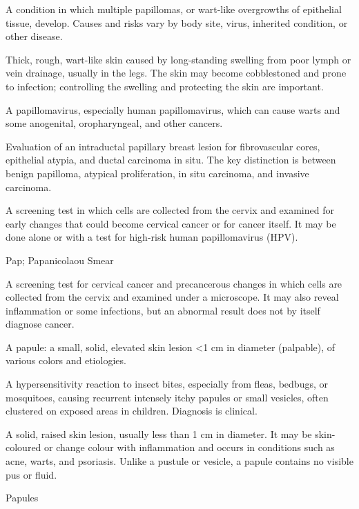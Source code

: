  A condition in which multiple papillomas, or wart-like overgrowths of epithelial tissue, develop. Causes and risks vary by body site, virus, inherited condition, or other disease.

 Thick, rough, wart-like skin caused by long-standing swelling from poor lymph or vein drainage, usually in the legs. The skin may become cobblestoned and prone to infection; controlling the swelling and protecting the skin are important.

 A papillomavirus, especially human papillomavirus, which can cause warts and some anogenital, oropharyngeal, and other cancers.

 Evaluation of an intraductal papillary breast lesion for fibrovascular cores, epithelial atypia, and ductal carcinoma in situ. The key distinction is between benign papilloma, atypical proliferation, in situ carcinoma, and invasive carcinoma.

 A screening test in which cells are collected from the cervix and examined for early changes that could become cervical cancer or for cancer itself. It may be done alone or with a test for high-risk human papillomavirus (HPV).

\synonyms
Pap; Papanicolaou Smear

 A screening test for cervical cancer and precancerous changes in which cells are collected from the cervix and examined under a microscope. It may also reveal inflammation or some infections, but an abnormal result does not by itself diagnose cancer.

 A papule: a small, solid, elevated skin lesion <1 cm in diameter (palpable), of various
colors and etiologies.

 A hypersensitivity reaction to insect bites, especially from fleas, bedbugs, or
mosquitoes, causing recurrent intensely itchy papules or small vesicles, often clustered
on exposed areas in children. Diagnosis is clinical.

 A solid, raised skin lesion, usually less than 1 cm in diameter. It may be skin-coloured or change colour with inflammation and occurs in conditions such as acne, warts, and psoriasis. Unlike a pustule or vesicle, a papule contains no visible pus or fluid.

\synonyms
Papules

